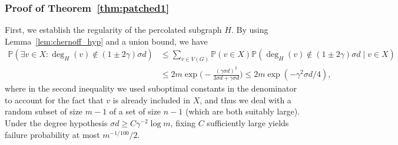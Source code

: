 \documentclass[reqno,a4paper]{amsart}
\theoremstyle{definition}
\begin{document}
\subsubsection{\texorpdfstring{Proof of Theorem~\ref{thm:patched1}}{Proof of Theorem~4.16}}

First, we establish the regularity of the percolated subgraph $H$.
By using Lemma~\ref{lem:chernoff_hyp} and a union bound, we have
\begin{align*}
\mathbb{P}(\exists v\in X: \deg_H(v)\notin(1\pm2\gamma)\sigma d) 
&\le\sum_{v\in V(G)}\mathbb{P}(v\in X)\mathbb{P}(\deg_H(v)\notin(1\pm2\gamma)\sigma d\mid v\in X)\\
&\le 2m\exp\bigg(-\frac{(\gamma \sigma d)^2}{3\sigma d+\gamma \sigma d}\bigg)\le 2m\exp(-\gamma^2 \sigma d/4),
\end{align*}
where in the second inequality we used suboptimal constants in the denominator to account for the fact that $v$ is already included in $X$, and thus we deal with a random subset of size $m-1$ of a set of size $n-1$ (which are both suitably large).
Under the degree hypothesis $\sigma d\ge C\gamma^{-2}\log m$, fixing $C$ sufficiently large yields failure probability at most $m^{-1/100}/2$.
\end{document}
